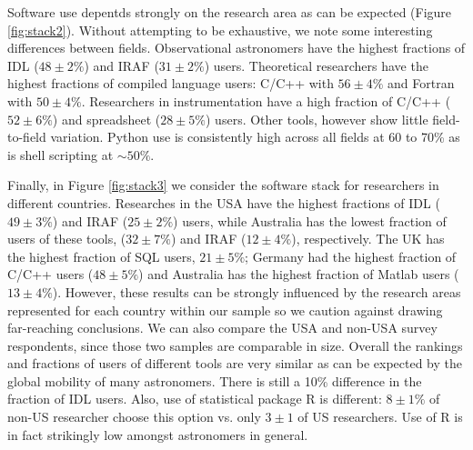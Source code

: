 Software use depentds strongly on the research area as can be expected (Figure \ref{fig:stack2}). Without attempting to be exhaustive, we note some interesting differences between fields. Observational astronomers have the highest fractions of IDL ($48\pm2\%$) and IRAF ($31\pm2\%$) users. Theoretical researchers have the highest fractions of compiled language users: C/C++ with $56\pm4\%$ and Fortran with $50\pm4\%$. Researchers in instrumentation have a high fraction of C/C++ ($52\pm6\%$) and spreadsheet ($28\pm5\%$) users. Other tools, however show little field-to-field variation. Python use is consistently high across all fields at 60 to 70\% as is shell scripting at $\sim50\%$. 

Finally, in Figure \ref{fig:stack3} we consider the software stack for researchers in different countries. Researches in the USA have the highest fractions of IDL ($49\pm3\%$) and IRAF ($25\pm2\%$) users, while Australia has the lowest fraction of users of these tools, ($32\pm7\%$) and IRAF ($12\pm4\%$), respectively. The UK has the highest fraction of SQL users, $21\pm5\%$; Germany had the highest fraction of C/C++ users ($48\pm5\%$) and Australia has the highest fraction of Matlab users ($13\pm4\%$). However, these results can be strongly influenced by the research areas represented for each country within our sample so we caution against drawing far-reaching conclusions. We can also compare the USA and non-USA survey respondents, since those two samples are comparable in size. Overall the rankings and fractions of users of different tools are very similar as can be expected by the global mobility of many astronomers. There is still a 10\% difference in the fraction of IDL users. Also, use of statistical package R is different:  $8\pm1\%$ of non-US researcher choose this option vs. only $3\pm1$ of US researchers. Use of R is in fact strikingly low amongst astronomers in general.